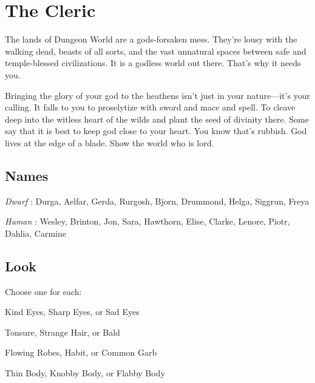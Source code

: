 \chapter{The Cleric}
  
 





The lands of Dungeon World are a gods-forsaken mess. They’re lousy with the walking dead, beasts of all sorts, and the vast unnatural spaces between safe and temple-blessed civilizations. It is a godless world out there. That’s why it needs you.

 

Bringing the glory of your god to the heathens isn’t just in your nature—it’s your calling. It falls to you to proselytize with sword and mace and spell. To cleave deep into the witless heart of the wilds and plant the seed of divinity there. Some say that it is best to keep god close to your heart. You know that’s rubbish. God lives at the edge of a blade. Show the world who is lord.



 
\section{Names}   
 



{\em Dwarf} : Durga, Aelfar, Gerda, Rurgosh, Bjorn, Drummond, Helga, Siggrun, Freya

 

{\em Human} : Wesley, Brinton, Jon, Sara, Hawthorn, Elise, Clarke, Lenore, Piotr, Dahlia, Carmine



 
\section{Look}  
 



Choose one for each:

 

Kind Eyes, Sharp Eyes, or Sad Eyes

 

Tonsure, Strange Hair, or Bald

 

Flowing Robes, Habit, or Common Garb

 

Thin Body, Knobby Body, or Flabby Body



